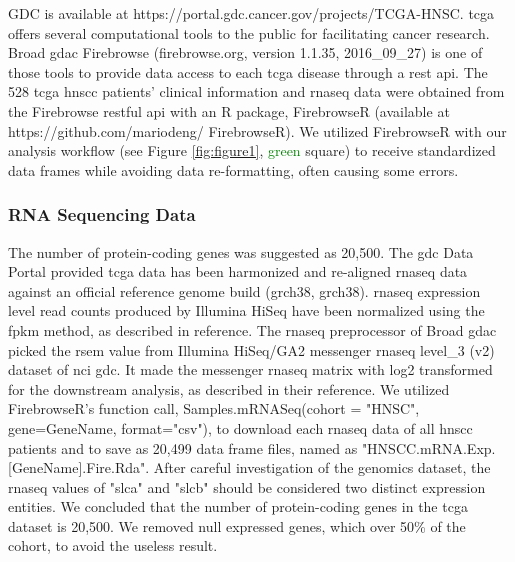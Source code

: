\documentclass[jpm,article,submit,moreauthors,pdftex]{Definitions/mdpi}
\begin{document}
\begin{paracol}{2}


GDC is available at https://portal.gdc.cancer.gov/projects/TCGA-HNSC.
\acrshort{tcga} offers several computational tools to the public for facilitating cancer research.
Broad \acrfull{gdac} Firebrowse (firebrowse.org, version 1.1.35, 2016\_09\_27) is one of those tools to provide data access to each \acrshort{tcga} disease through a \acrfull{rest} \acrfull{api}.
The 528 \acrshort{tcga} \acrshort{hnscc} patients' clinical information and \acrshort{rnaseq} data were obtained from the Firebrowse \acrshort{rest}ful \acrshort{api} with an R package, FirebrowseR (available at https://github.com/mariodeng/\linebreak
FirebrowseR)\cite{Deng2017}. 
We utilized FirebrowseR with our analysis workflow (see Figure \ref{fig:figure1}, \textcolor{green}{green} square) to receive standardized data frames while avoiding data re-formatting, often causing some errors.

\subsubsection{RNA Sequencing Data} 

The number of protein-coding genes was suggested as 20,500\cite{Clamp2007}. The \acrshort{gdc} Data Portal provided \acrshort{tcga} data has been harmonized and re-aligned \acrlong{rnaseq} data against an official reference genome build (\acrlong{grch38}, \acrshort{grch38}). \acrshort{rnaseq} expression level read counts produced by Illumina HiSeq have been normalized using the \acrfull{fpkm} method, as described in reference\cite{FPKM2017}.
The \acrshort{rnaseq} preprocessor of Broad \acrshort{gdac} picked the \acrfull{rsem} value from Illumina HiSeq/GA2 messenger \acrshort{rnaseq} level\_3 (v2) dataset of \acrshort{nci} \acrshort{gdc}. It made the messenger \acrshort{rnaseq} matrix with log2 transformed for the downstream analysis, as described in their reference\cite{RSEM2016}.
We utilized FirebrowseR's function call, Samples.mRNASeq(cohort = "HNSC", gene=GeneName, format="csv"), to download each \acrshort{rnaseq} data of all \acrshort{hnscc} patients and to save as 20,499 data frame files, named as "HNSCC.mRNA.Exp.[GeneName].Fire.Rda".
After careful investigation of the genomics dataset, the \acrshort{rnaseq} values of "\acrfull{slca}" and "\acrfull{slcb}" should be considered two distinct expression entities. We concluded that the number of protein-coding genes in the \acrshort{tcga} dataset is 20,500. We removed null expressed genes, which over 50\% of the cohort, to avoid the useless result.


\end{paracol}
\end{document}
